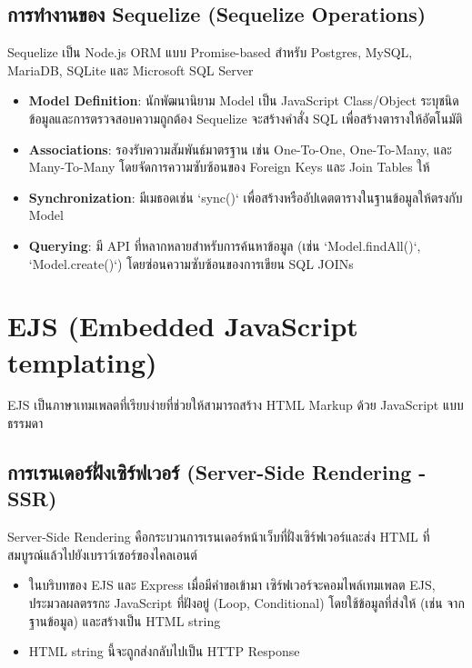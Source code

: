 \subsection{การทำงานของ Sequelize (Sequelize Operations)}
Sequelize เป็น Node.js ORM แบบ Promise-based สำหรับ Postgres, MySQL, MariaDB, SQLite และ Microsoft SQL Server
\begin{itemize}
    \item \textbf{Model Definition}: นักพัฒนานิยาม Model เป็น JavaScript Class/Object ระบุชนิดข้อมูลและการตรวจสอบความถูกต้อง Sequelize จะสร้างคำสั่ง SQL เพื่อสร้างตารางให้อัตโนมัติ
    \item \textbf{Associations}: รองรับความสัมพันธ์มาตรฐาน เช่น One-To-One, One-To-Many, และ Many-To-Many โดยจัดการความซับซ้อนของ Foreign Keys และ Join Tables ให้
    \item \textbf{Synchronization}: มีเมธอดเช่น `sync()` เพื่อสร้างหรืออัปเดตตารางในฐานข้อมูลให้ตรงกับ Model
    \item \textbf{Querying}: มี API ที่หลากหลายสำหรับการค้นหาข้อมูล (เช่น `Model.findAll()`, `Model.create()`) โดยซ่อนความซับซ้อนของการเขียน SQL JOINs
\end{itemize}

\section{EJS (Embedded JavaScript templating)}
EJS เป็นภาษาเทมเพลตที่เรียบง่ายที่ช่วยให้สามารถสร้าง HTML Markup ด้วย JavaScript แบบธรรมดา

\subsection{การเรนเดอร์ฝั่งเซิร์ฟเวอร์ (Server-Side Rendering - SSR)}
Server-Side Rendering คือกระบวนการเรนเดอร์หน้าเว็บที่ฝั่งเซิร์ฟเวอร์และส่ง HTML ที่สมบูรณ์แล้วไปยังเบราว์เซอร์ของไคลเอนต์
\begin{itemize}
    \item ในบริบทของ EJS และ Express เมื่อมีคำขอเข้ามา เซิร์ฟเวอร์จะคอมไพล์เทมเพลต EJS, ประมวลผลตรรกะ JavaScript ที่ฝังอยู่ (Loop, Conditional) โดยใช้ข้อมูลที่ส่งให้ (เช่น จากฐานข้อมูล) และสร้างเป็น HTML string
    \item HTML string นี้จะถูกส่งกลับไปเป็น HTTP Response
\end{itemize}

